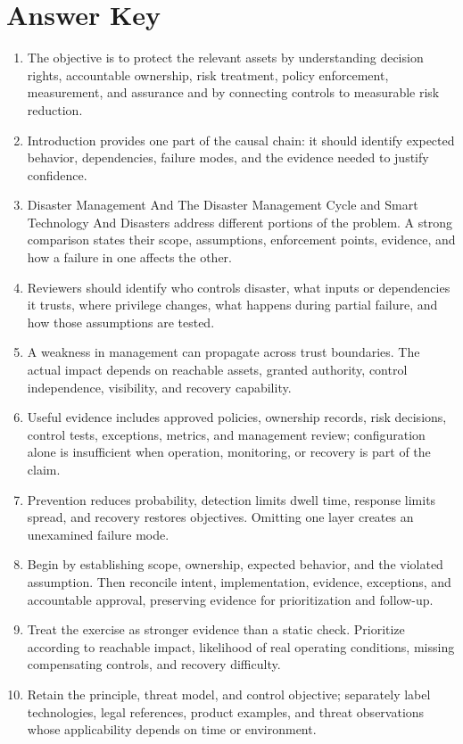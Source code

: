 \documentclass[11pt]{article}
\begin{document}
\section*{Answer Key}
\begin{enumerate}
\item The objective is to protect the relevant assets by understanding decision rights, accountable ownership, risk treatment, policy enforcement, measurement, and assurance and by connecting controls to measurable risk reduction.
\item Introduction provides one part of the causal chain: it should identify expected behavior, dependencies, failure modes, and the evidence needed to justify confidence.
\item Disaster Management And The Disaster Management Cycle and Smart Technology And Disasters address different portions of the problem. A strong comparison states their scope, assumptions, enforcement points, evidence, and how a failure in one affects the other.
\item Reviewers should identify who controls disaster, what inputs or dependencies it trusts, where privilege changes, what happens during partial failure, and how those assumptions are tested.
\item A weakness in management can propagate across trust boundaries. The actual impact depends on reachable assets, granted authority, control independence, visibility, and recovery capability.
\item Useful evidence includes approved policies, ownership records, risk decisions, control tests, exceptions, metrics, and management review; configuration alone is insufficient when operation, monitoring, or recovery is part of the claim.
\item Prevention reduces probability, detection limits dwell time, response limits spread, and recovery restores objectives. Omitting one layer creates an unexamined failure mode.
\item Begin by establishing scope, ownership, expected behavior, and the violated assumption. Then reconcile intent, implementation, evidence, exceptions, and accountable approval, preserving evidence for prioritization and follow-up.
\item Treat the exercise as stronger evidence than a static check. Prioritize according to reachable impact, likelihood of real operating conditions, missing compensating controls, and recovery difficulty.
\item Retain the principle, threat model, and control objective; separately label technologies, legal references, product examples, and threat observations whose applicability depends on time or environment.
\end{enumerate}
\end{document}
